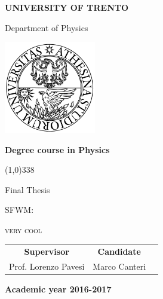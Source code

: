 \begin{titlepage}
  \pagestyle{empty}

  \begin{center}
    {\bfseries
      \Large {\huge U}NIVERSITY OF {\huge T}RENTO}

    \vspace{0.2cm}

    {\Large Department of Physics}

    \vspace{0.5cm}

    \begin{center}
      \includegraphics[width=0.3\textwidth]{img/logo_unitn.png}
    \end{center}

    \vspace{0.5cm}

    {\bfseries \Large Degree course in Physics}

    \vspace{0.3cm}
    \line(1,0){338}
    \vspace{0.3cm}

    {\Large Final Thesis}

    \vspace{2.5cm}

    {\huge \textsc{SFWM:}}

    \vspace{0.2cm}

    {\huge \textsc{very cool}}

    \vspace{3.0cm}


    \large
    \begin{center}
      \begin{tabular}{ccc}
        {\bfseries Supervisor} &
        \hspace{5cm}
        {\bfseries Candidate} \\

        Prof. Lorenzo Pavesi &
        \hspace{5cm} Marco Canteri \\


      \end{tabular}
    \end{center}
    \vspace{2cm}

    {\bfseries \large Academic year 2016-2017}
    \vfill
  \end{center}
\end{titlepage}
